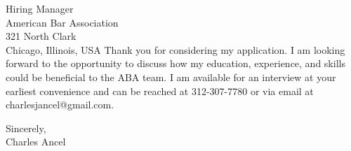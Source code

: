 \documentclass{letter}
\begin{document}
\begin{letter}{Hiring Manager\\American Bar Association\\321 North Clark\\Chicago, Illinois, USA}
Thank you for considering my application. I am looking forward to the opportunity to discuss how my education, experience, and skills could be beneficial to the ABA team. I am available for an interview at your earliest convenience and can be reached at 312-307-7780 or via email at charlesjancel@gmail.com.

\begin{flushleft}
    Sincerely,\\
    Charles Ancel
    \end{flushleft}
\end{letter}
\end{document}
